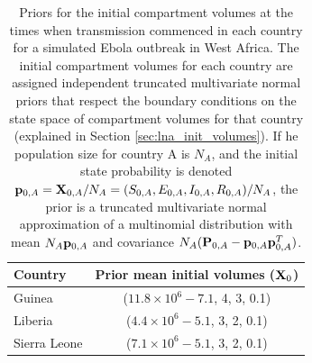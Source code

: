 \begin{table}
	\caption[Priors for initial compartment volumes for a simulated Ebola outbreak in West Africa]{Priors for the initial compartment volumes at the times when transmission commenced in each country for a simulated Ebola outbreak in West Africa. The initial compartment volumes for each country are assigned independent truncated multivariate normal priors that respect the boundary conditions on the state space of compartment volumes for that country (explained in Section \ref{sec:lna_init_volumes}). If he population size for country A is $ N_A $, and the initial state probability is denoted $ \mathbf{p}_{0,A} = \mathbf{X}_{0,A}/N_A  = (S_{0,A}, E_{0,A}, I_{0,A}, R_{0,A})/N_A$, the prior is a truncated multivariate normal approximation of a multinomial distribution with mean $ N_A\mathbf{p}_{0,A}$ and covariance $ N_A(\mathbf{P}_{0,A} - \mathbf{p}_{0,A}\mathbf{p}_{0,A}^T) $.} 
	\label{tab:ebola_synth_initdist_priors}
	\centering
	\begin{tabular}{lc}
		\hline \textbf{Country} & \textbf{Prior mean initial volumes} ($ \mathbf{X}_0 $) \\
		\hline
		Guinea & ($ 11.8\times10^6 -7.1$, 4, 3, 0.1) \\
		Liberia & ($ 4.4\times10^6 -5.1$, 3, 2, 0.1) \\
		Sierra Leone & ($ 7.1\times10^6 -5.1$, 3, 2, 0.1) \\
		\hline
	\end{tabular}
\end{table}

